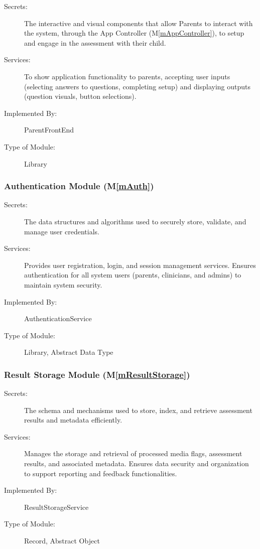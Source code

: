 \documentclass[12pt, titlepage]{article}
\newcommand{\mref}[1]{M\ref{#1}}
\begin{document}
\begin{description}
\item[Secrets:]The interactive and visual components that allow Parents to interact with the system, through the App Controller (\mref{mAppController}),
               to setup and engage in the assessment with their child.
\item[Services:] To show application functionality to parents, accepting user inputs (selecting answers to questions,
                 completing setup) and displaying outputs (question visuals, button selections).
\item[Implemented By:] ParentFrontEnd
\item[Type of Module:] Library
\end{description}

\subsubsection{Authentication Module (\mref{mAuth})}

\begin{description}
\item[Secrets:] The data structures and algorithms used to securely store, validate, and manage user credentials.
\item[Services:] Provides user registration, login, and session management services. Ensures authentication for all system users (parents, clinicians, and admins) to maintain system security.
\item[Implemented By:] AuthenticationService
\item[Type of Module:] Library, Abstract Data Type
\end{description}

\subsubsection{Result Storage Module (\mref{mResultStorage})}

\begin{description}
\item[Secrets:] The schema and mechanisms used to store, index, and retrieve assessment results and metadata efficiently.
\item[Services:] Manages the storage and retrieval of processed media flags, assessment results, and associated metadata. Ensures data security and organization to support reporting and feedback functionalities.
\item[Implemented By:] ResultStorageService
\item[Type of Module:] Record, Abstract Object
\end{description}
\end{document}
